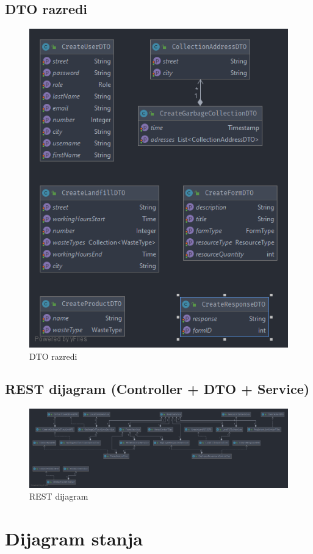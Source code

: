 		\subsection{DTO razredi}
		\begin{figure}[H]
			\includegraphics[width=0.7\linewidth]{slike/dtos.png}
			\centering
			\caption{DTO razredi}
			\label{fig:dtos}
		\end{figure}
	
		\subsection{REST dijagram (Controller + DTO + Service)}
		\begin{figure}[H]
			\includegraphics[width=\linewidth]{slike/REST_ControllerDTOService.png}
			\centering
			\caption{REST dijagram}
			\label{fig:rest_razredi}
		\end{figure}
		
				
		\clearpage
		

		\section{Dijagram stanja}
		

